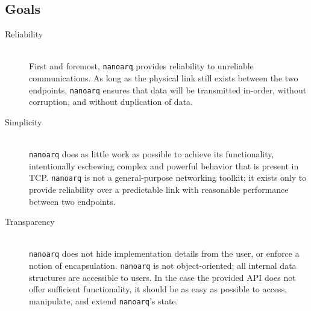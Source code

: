\documentclass[11pt]{article}
\newcommand{\nanoarq}{\texttt{nanoarq}}
\begin{document}
\subsection{Goals}
\begin{description}
\item[Reliability] \hfill \\
    First and foremost, \nanoarq{} provides reliability to unreliable communications. As long as the physical link still exists between the two endpoints, \nanoarq{} ensures that data will be transmitted in-order, without corruption, and without duplication of data.

\item[Simplicity] \hfill \\
    \nanoarq{} does as little work as possible to achieve its functionality, intentionally eschewing complex and powerful behavior that is present in TCP. \nanoarq{} is not a general-purpose networking toolkit; it exists only to provide reliability over a predictable link with reasonable performance between two endpoints.

\item[Transparency] \hfill \\
    \nanoarq{} does not hide implementation details from the user, or enforce a notion of encapsulation. \nanoarq{} is not object-oriented; all internal data structures are accessible to users. In the case the provided API does not offer sufficient functionality, it should be as easy as possible to access, manipulate, and extend \nanoarq{}'s state.


\end{description}
\end{document}
